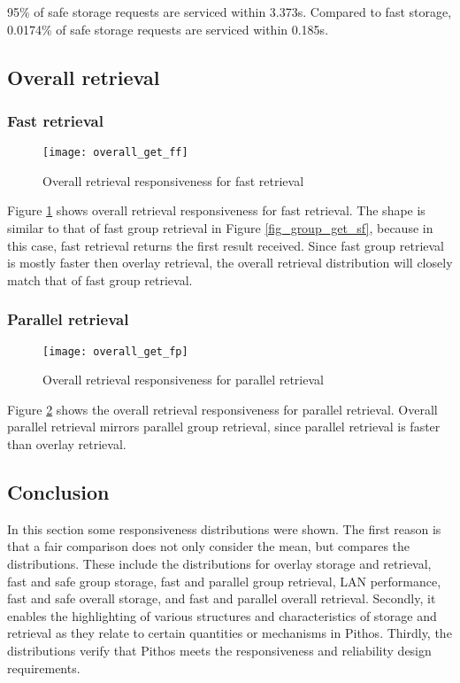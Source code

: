 95\% of safe storage requests are serviced within 3.373s. Compared to fast storage, 0.0174\% of safe storage requests are serviced within 0.185s.

\subsection{Overall retrieval}
\subsubsection{Fast retrieval}
\begin{figure}[htbp]
 \centering
 \texttt{[image: overall\_get\_ff]}
 \caption{Overall retrieval responsiveness for fast retrieval}
 \label{fig_overall_get_ff}
\end{figure}
%
Figure \ref{fig_overall_get_ff} shows overall retrieval responsiveness for fast retrieval. The shape is similar to that of fast group retrieval in Figure \ref{fig_group_get_sf}, because in this case, fast retrieval returns the first result received. Since fast group retrieval is mostly faster then overlay retrieval, the overall retrieval distribution will closely match that of fast group retrieval.

\subsubsection{Parallel retrieval}
\begin{figure}[htbp]
 \centering
 \texttt{[image: overall\_get\_fp]}
 \caption{Overall retrieval responsiveness for parallel retrieval}
 \label{fig_overall_get_fp}
\end{figure}
%
Figure \ref{fig_overall_get_fp} shows the overall retrieval responsiveness for parallel retrieval. Overall parallel retrieval mirrors parallel group retrieval, since parallel retrieval is faster than overlay retrieval.

\subsection{Conclusion}

In this section some responsiveness distributions were shown. The first reason is that a fair comparison does not only consider the mean, but compares the distributions. These include the distributions for overlay storage and retrieval, fast and safe group storage, fast and parallel group retrieval, LAN performance, fast and safe overall storage, and fast and parallel overall retrieval. Secondly, it enables the highlighting of various structures and characteristics of storage and retrieval as they relate to certain quantities or mechanisms in Pithos. Thirdly, the distributions verify that Pithos meets the responsiveness and reliability design requirements.

